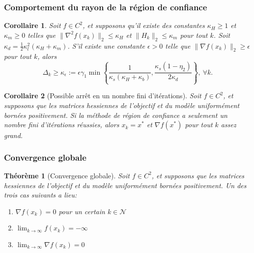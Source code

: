\documentclass[t,usepdftitle=false]{beamer}
\newtheorem{thm}{Théorème}
\newtheorem{coro}{Corollaire}
\def\cN{\mathcal{N}}
\begin{document}
\begin{frame}
\frametitle{Comportement du rayon de la région de confiance}

\begin{coro}
Soit $f \in C^2$, et supposons qu'il existe des constantes $\kappa_H \geq 1$ et $\kappa_m \geq 0$ telles que $\| \nabla^2 f(x_k) \|_2 \leq \kappa_H$ et $\| H_k \|_2 \leq \kappa_m$ pour tout $k$.
Soit $\kappa_d = \frac{1}{2} \kappa_l^2 (\kappa_H + \kappa_m)$.
S'il existe une constante $\epsilon > 0$ telle que $\| \nabla f(x_k) \|_2 \geq \epsilon$ pour tout $k$, alors
$$
\Delta_k \geq \kappa_{\epsilon} := \epsilon \gamma_1
\min \left\{ \frac{1}{\kappa_s(\kappa_H + \kappa_b)}, \frac{\kappa_s(1-\eta_2)}{2\kappa_d} \right\},\ \forall k.
$$
\end{coro}

\begin{coro}[Possible arrêt en un nombre fini d'itérations]
Soit $f \in C^2$, et supposons que les matrices hessiennes de l'objectif et du modèle uniformément bornées positivement.
Si la méthode de région de confiance a seulement un nombre fini d'itérations réussies, alors $x_k = x^*$ et $\nabla f(x^*)$ pour tout $k$ assez grand.
\end{coro}

\end{frame}

\begin{frame}
\frametitle{Convergence globale}

\begin{thm}[Convergence globale]
Soit $f \in C^2$, et supposons que les matrices hessiennes de l'objectif et du modèle uniformément bornées positivement.
Un des trois cas suivants a lieu:
\begin{enumerate}
\item
$\nabla f(x_k) = 0$ pour un certain $k \in \cN$
\item
$\lim_{k \rightarrow \infty} f(x_k) = -\infty$
\item
$\lim_{k \rightarrow \infty} \nabla f(x_k) = 0$
\end{enumerate}
\end{thm}

\end{frame}
\end{document}
